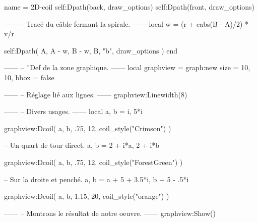 \documentclass[varwidth]{standalone}
\begin{document}
\begin{luadraw}{name = 2D-coil}
  self:Dpath(back, draw_options)
  self:Dpath(front, draw_options)

------
-- Tracé du câble fermant la spirale.
------
  local w = (r + cabs(B - A)/2) * v/r

  self:Dpath(
    {A, A - w, B - w, B, "b"},
    draw_options
  )
end

------
-- ¨Def de la zone graphique.
------
local graphview = graph:new{
  size = {10, 10},
  bbox = false
}

------
-- Réglage lié aux lignes.
------
graphview:Linewidth(8)

------
-- Divers usages.
------
local a, b = i, 5*i

graphview:Dcoil(
  a, b,
  .75,
  12,
  coil_style("Crimson")
)

-- Un quart de tour direct.
a, b = 2 + i*a, 2 + i*b

graphview:Dcoil(
  a, b,
  .75,
  12,
  coil_style("ForestGreen")
)

-- Sur la droite et penché.
a, b = a + 5 + 3.5*i, b + 5 - .5*i

graphview:Dcoil(
  a, b,
  1.15,
  20,
  coil_style("orange")
)

------
-- Montrons le résultat de notre oeuvre.
------
graphview:Show()
\end{luadraw}
\end{document}
